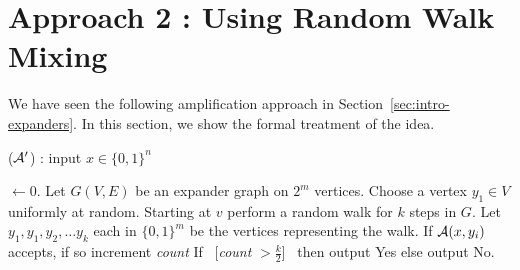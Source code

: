
\section{Approach 2 : Using Random Walk Mixing}

We have seen the following amplification approach in Section~\ref{sec:intro-expanders}. In this section, we show the formal treatment of the idea.

\begin{algorithm}
\label{alg:expwalk-amplification}
\caption{(${\cal{A}'}$) : input $x \in \{0,1\}^n$} 
\begin{algorithmic}[1]
 $\gets 0$. 
\State Let $G(V,E)$ be an expander graph on $2^{m}$ vertices.
\State Choose a vertex $y_1 \in V$ uniformly at random. 
\State Starting at $v$ perform a random walk for $k$ steps in $G$. Let $y_1, y_1, y_2, \ldots y_k$ each in $\{0,1\}^m$ be the vertices representing the walk. 
	\State If ${\cal{A}}(x,y_i)$ accepts, if so increment {\em count}
\EndFor
\State If ~[{\em count} $> \frac{k}{2}$]~ then output {\sc Yes} else output {\sc No}.
\end{algorithmic}
\end{algorithm}

